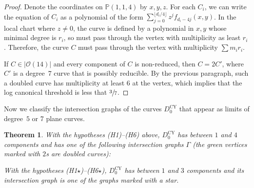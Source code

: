 \documentclass[JEP,XML,SOM,Unicode,NoFloatCountersInSection,published]{cedram}
\theoremstyle{plain}
\newtheorem{theorem}{Theorem}[section]
\theoremstyle{definition}
\newcommand\PP{{\mathbb{P}}}
\newcommand\Oc{{\mathcal O}}
\newcommand\Dcyo{{D^{\mathrm{CY}}_0}}
\begin{document}
\begin{proof}
Denote the coordinates on $\PP(1,1,4)$ by $x,y,z$. For each $C_i$, we can write the equation of $C_i$ as a polynomial of the form $\sum_{j = 0}^{\lfloor d_i/4 \rfloor} z^j f_{d_i - 4j}(x,y)$. In the local chart where $z \ne 0$, the curve is defined by a polynomial in $x,y$ whose minimal degree is $r_i$, so must pass through the vertex with multiplicity as least $r_i$. Therefore, the curve $C$ must pass through the vertex with multiplicity $\sum m_i r_i$.

If $C \in |\Oc(14)|$ and every component of $C$ is non-reduced, then $C = 2C'$, where~$C'$ is a degree~$7$ curve that is possibly reducible. By the previous paragraph, such a doubled curve has multiplicity at least $6$ at the vertex, which implies that the log canonical threshold is less that $\sfrac{3}{7}$.
\end{proof}

Now we classify the intersection graphs of the curves $\Dcyo$ that appear as limits of degree~$5$ or 7 plane curves.

\begin{theorem}\label{thm:possibledualgraphs}
With the hypotheses \textup{(H1)--(H6)} above, $\Dcyo$ has between $1$ and $4$ components and has one of the following intersection graphs $\Gamma$ (the green vertices marked with $2$s are doubled curves):\vspace*{-5pt}
\begin{center}
\vspace*{2pt}
\end{center}
With the hypotheses \textup{(H1$\star$)--(H6$\star$)}, $\Dcyo$ has between $1$ and $3$ components and its intersection graph is one of the graphs marked with a star.
\end{theorem}
\end{document}
